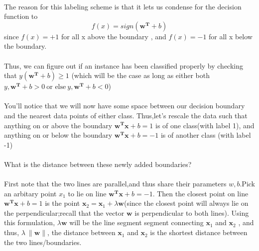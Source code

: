 \documentclass[a4paper]{article}
\begin{document}
\begin{algorithm}
\begin{algorithmic}
\paragraph{}
The reason for this labeling scheme is that it lets us condense for the decision function to 
$$f(x) = sign(\textbf{w}^\textbf{T} + b )$$ since $f(x) = +1 $ for all x above the boundary , and $f(x) = -1$ for all x below the boundary.

\paragraph{}
Thus, we can figure out if an instance has been classified properly by checking that $y(\textbf{w}^\textbf{T} + b ) \geq 1 $ (which will be the case as long as either both $y, \textbf{w}^\textbf{T} + b > 0 \  \text{or else} \  y,   \textbf{w}^\textbf{T} + b < 0 $)

\paragraph{}
You'll notice that we will now have some space between our decision boundary and the nearest data points of either class. Thus,let's rescale the data such that anything on or above the boundary $\textbf{w}^\textbf{T}\textbf {x} + b = 1 $ is of one class(with label 1), and anything on or below the boundary $\textbf{w}^\textbf{T}\textbf {x} + b = -1 $ is of another class (with label -1)

\paragraph{}
What is the distance between these newly added boundaries?
\paragraph{}
First note that the two lines are parallel,and thus share their parameters $w,b$.Pick an arbitary point $x_{1}$ to lie on line $ \textbf{w}^\textbf{T}\textbf {x} + b = -1 $. Then the closest point on line $ \textbf{w}^\textbf{T}\textbf {x} + b = 1 $ is the point $\textbf{x}_{2} = \textbf{x}_{1} + \lambda\textbf{w} $(since the closest point will always lie on the perpendicular;recall that the vector $\textbf{w}$ is perpendicular to both lines). Using this formulation, $\lambda\textbf{w}$ will be the line segment segment connecting $\textbf{x}_{1}$ and $\textbf{x}_{2}$ , and thus, $\lambda\ \|\textbf{w}\|$, the distance between $\textbf{x}_{1}$ and $\textbf{x}_{2}$ is the shortest distance between the two lines/boundaries.





\end{algorithmic}
\end{algorithm}
\end{document}
